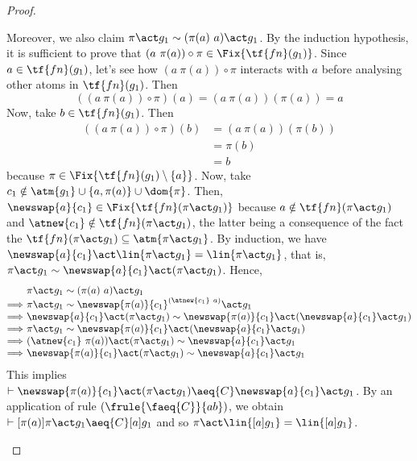 \begin{proof}
\begin{enumerate}
\begin{itemize}
\begin{enumerate}
                    Moreover, we also claim $\pi\act g_1 \sim (\pi(a) \ a)\act g_1$.  By the induction hypothesis, it is sufficient to prove that $(a \ \pi(a))\circ\pi\in\Fix{\tf{fn}(g_1)}$. Since $a\in \tf{fn}(g_1)$, let's see how $(a \ \pi(a))\circ\pi$ interacts with $a$ before analysing other atoms in $\tf{fn}(g_1)$. Then
                            \[
                                ((a \ \pi(a))\circ\pi)(a) = (a \ \pi(a))(\pi(a)) = a
                            \]
                            Now, take $b\in\tf{fn}(g_1)$. Then
                            \begin{align*}
                                ((a \ \pi(a))\circ\pi)(b) &= (a \ \pi(a))(\pi(b)) \\
                                &= \pi(b)\\
                                &= b
                            \end{align*}
                        because $\pi\in\Fix{\tf{fn}(g_1)\setminus\{a\}}$. Now, take $c_1\notin \atm{g_1}\cup\{a,\pi(a)\}\cup\dom{\pi}$. Then, $\newswap{a}{c_1}\in \Fix{\tf{fn}(\pi\act g_1)}$ because $a\notin \tf{fn}(\pi\act g_1)$ and $\atnew{c_1}\notin \tf{fn}(\pi\act g_1)$, the latter being a consequence of the fact the $\tf{fn}(\pi\act g_1)\subseteq \atm{\pi\act g_1}$. By induction, we have $\newswap{a}{c_1}\act\lin{\pi\act g_1} = \lin{\pi\act g_1}$, that is, $\pi\act g_1 \sim \newswap{a}{c_1}\act (\pi\act g_1)$. Hence,
                   \begin{equation*}
                        \begin{tabular}{@{}l@{ }l@{}l@{}}
                            & $\pi\act g_1 \sim (\pi(a) \ a)\act g_1$ &  \\
                            $\Longrightarrow$ & $\pi\act g_1 \sim \newswap{\pi(a)}{c_1}^{(\atnew{c_1} \ a)}\act g_1$ & \\
                            $\Longrightarrow$ & $\newswap{a}{c_1}\act (\pi\act g_1) \sim \newswap{\pi(a)}{c_1}\act (\newswap{a}{c_1}\act g_1)$ & \\
                            $\Longrightarrow$ & $\pi\act g_1 \sim \newswap{\pi(a)}{c_1}\act (\newswap{a}{c_1}\act g_1)$ & \\
                             $\Longrightarrow$ & $(\atnew{c_1} \ \pi(a))\act (\pi\act g_1) \sim \newswap{a}{c_1}\act g_1$ & \\
                            $\Longrightarrow$ & $\newswap{\pi(a)}{c_1}\act (\pi\act g_1) \sim \newswap{a}{c_1}\act g_1$ &
                        \end{tabular}
                    \end{equation*}
                    This implies $\vdash \newswap{\pi(a)}{c_1}\act (\pi\act g_1)  \aeq{C} \newswap{a}{c_1}\act g_1$. By an application of rule $(\frule{\faeq{C}}{ab})$, we obtain $\vdash [\pi(a)]\pi\act g_1 \aeq{C} [a]g_1$ and so $\pi\act \lin{[a]g_1} = \lin{[a]g_1}$.
                \end{enumerate}
            \end{itemize}


\end{enumerate}
\end{proof}
